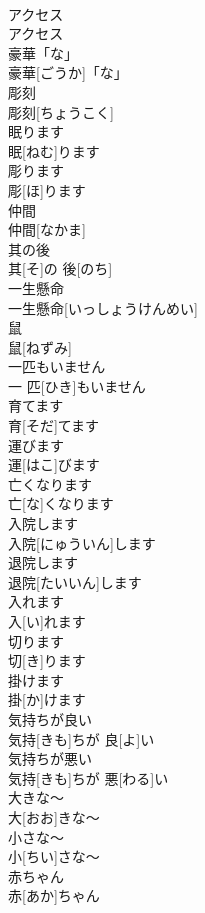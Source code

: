 \documentclass[8pt]{extreport}
\begin{document}
\begin{CJK}{UTF8}{min}
\\	アクセス	
\\	アクセス	
\\	豪華「な」	
\\	豪華[ごうか]「な」	
\\	彫刻	
\\	彫刻[ちょうこく]	
\\	眠ります	
\\	眠[ねむ]ります	
\\	彫ります	
\\	彫[ほ]ります	
\\	仲間	
\\	仲間[なかま]	
\\	其の後	
\\	其[そ]の 後[のち]	
\\	一生懸命	
\\	一生懸命[いっしょうけんめい]	
\\	鼠	
\\	鼠[ねずみ]	
\\	一匹もいません	
\\	一 匹[ひき]もいません	
\\	育てます	
\\	育[そだ]てます	
\\	運びます	
\\	運[はこ]びます	
\\	亡くなります	
\\	亡[な]くなります	
\\	入院します	
\\	入院[にゅういん]します	
\\	退院します	
\\	退院[たいいん]します	
\\	入れます	
\\	入[い]れます	
\\	切ります
\\	切[き]ります
\\	掛けます
\\	掛[か]けます
\\	気持ちが良い	
\\	気持[きも]ちが 良[よ]い	
\\	気持ちが悪い	
\\	気持[きも]ちが 悪[わる]い	
\\	大きな〜	
\\	大[おお]きな〜	
\\	小さな〜	
\\	小[ちい]さな〜	
\\	赤ちゃん	
\\	赤[あか]ちゃん	

\end{CJK}
\end{document}

